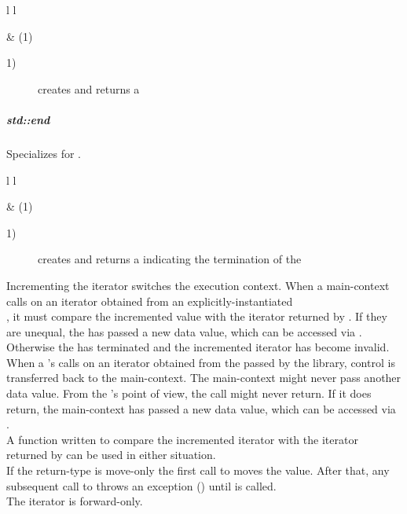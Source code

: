 \begin{tabular}{ l l }
    \midrule

     & (1)\\

    \midrule
\end{tabular}

\begin{description}
    \item[1)] creates and returns a \\
\end{description}

\subparagraph*{std::end}
Specializes  for \pullcoro.\\

\begin{tabular}{ l l }
    \midrule

     & (1)\\

    \midrule
\end{tabular}

\begin{description}
    \item[1)] creates and returns a  indicating the termination of the \corofunction\\
\end{description}

Incrementing the iterator switches the execution context.
\newline
When a main-context calls  on an iterator obtained
from an explicitly-instantiated\\
\pullcoro, it must compare the incremented
value with the iterator returned by . If they are unequal, the
\corofunction has passed a new data value, which can be accessed via
. Otherwise the \corofunction has terminated and the
incremented iterator has become invalid.\\
When a \pushcoro's \corofunction calls  on an iterator
obtained from the \pullcoro passed by the library, control is transferred back
to the main-context. The main-context might never pass another data value. From
the \corofunction's point of view, the  call might
never return. If it does return, the main-context has passed a new data value,
which can be accessed via .\\
A function written to compare the incremented iterator with the iterator
returned by  can be used in either situation.\\
If the return-type is move-only the first call to 
moves the value. After that, any subsequent call to  throws an
exception () until  is called.\\
The iterator is forward-only.\\

